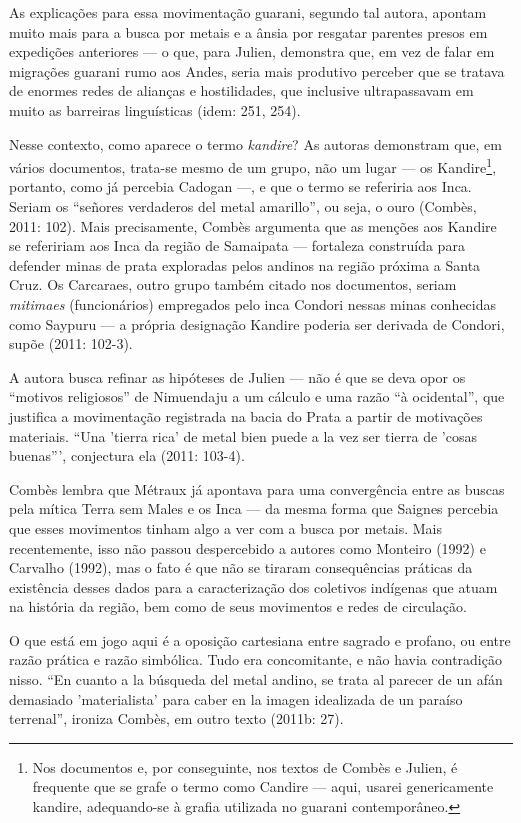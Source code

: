 As explicações para essa movimentação guarani, segundo tal autora,
apontam muito mais para a busca por metais e a ânsia por resgatar
parentes presos em expedições anteriores --- o que, para Julien,
demonstra que, em vez de falar em migrações guarani rumo aos Andes,
seria mais produtivo perceber que se tratava de enormes redes de
alianças e hostilidades, que inclusive ultrapassavam em muito as
barreiras linguísticas (idem: 251, 254).

Nesse contexto, como aparece o termo \emph{kandire}? As autoras
demonstram que, em vários documentos, trata-se mesmo de um grupo, não um
lugar --- os Kandire\footnote{Nos documentos e, por conseguinte, nos
  textos de Combès e Julien, é frequente que se grafe o termo como
  Candire --- aqui, usarei genericamente kandire, adequando-se à grafia
  utilizada no guarani contemporâneo.}, portanto, como já percebia
Cadogan ---, e que o termo se referiria aos Inca. Seriam os ``señores
verdaderos del metal amarillo'', ou seja, o ouro (Combès, 2011: 102).
Mais precisamente, Combès argumenta que as menções aos Kandire se
refeririam aos Inca da região de Samaipata --- fortaleza construída para
defender minas de prata exploradas pelos andinos na região próxima a
Santa Cruz. Os Carcaraes, outro grupo também citado nos documentos,
seriam \emph{mitimaes} (funcionários) empregados pelo inca Condori
nessas minas conhecidas como Saypuru --- a própria designação Kandire
poderia ser derivada de Condori, supõe (2011: 102-3).

A autora busca refinar as hipóteses de Julien --- não é que se deva opor
os ``motivos religiosos'' de Nimuendaju a um cálculo e uma razão ``à
ocidental'', que justifica a movimentação registrada na bacia do Prata a
partir de motivações materiais. ``Una 'tierra rica' de metal bien puede
a la vez ser tierra de 'cosas buenas''', conjectura ela (2011: 103-4).

Combès lembra que Métraux já apontava para uma convergência entre as
buscas pela mítica Terra sem Males e os Inca --- da mesma forma que
Saignes percebia que esses movimentos tinham algo a ver com a busca por
metais. Mais recentemente, isso não passou despercebido a autores como
Monteiro (1992) e Carvalho (1992), mas o fato é que não se tiraram
consequências práticas da existência desses dados para a caracterização
dos coletivos indígenas que atuam na história da região, bem como de
seus movimentos e redes de circulação.

O que está em jogo aqui é a oposição cartesiana entre sagrado e profano,
ou entre razão prática e razão simbólica. Tudo era concomitante, e não
havia contradição nisso. ``En cuanto a la búsqueda del metal andino, se
trata al parecer de un afán demasiado 'materialista' para caber en la
imagen idealizada de un paraíso terrenal'', ironiza Combès, em outro
texto (2011b: 27).

